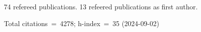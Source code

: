 74 refereed publications. 13 refeered publications as first author.

Total citations~=~4278; h-index~=~35 (2024-09-02)